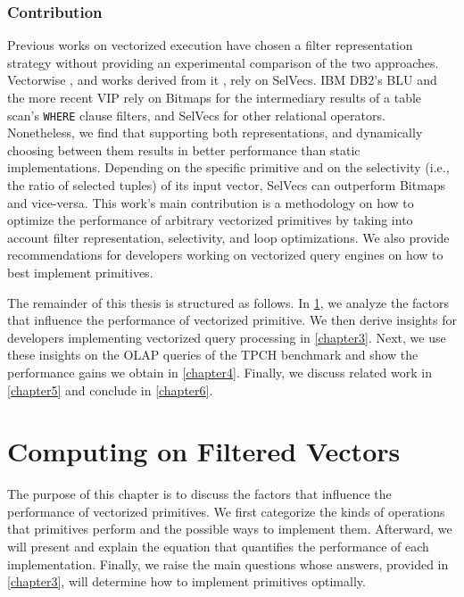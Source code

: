 \documentclass[12pt]{cmuthesis}
\begin{document}
\subsection{Contribution}
Previous works on vectorized execution have chosen a filter representation strategy without providing an experimental comparison of the two approaches. Vectorwise \cite{vectorwise}, and works derived from it \cite{miro_adapt,everything_vectorized,sompolski_vec},  rely on SelVecs. IBM DB2's BLU \cite{ibm_blu} and the more recent VIP \cite{orestis_bitmap} rely on Bitmaps for the intermediary results of a table scan's \texttt{WHERE} clause filters, and SelVecs for other relational operators. Nonetheless, we find that supporting both representations, and dynamically choosing between them results in better performance than static implementations. Depending on the specific primitive and on the selectivity (i.e., the ratio of selected tuples) of its input vector, SelVecs can outperform Bitmaps and vice-versa. This work's main contribution is a methodology on how to optimize the performance of arbitrary vectorized primitives by taking into account filter representation, selectivity, and loop optimizations. We also provide recommendations for developers working on vectorized query engines on how to best implement primitives.

The remainder of this thesis is structured as follows. In \cref{chapter2}, we analyze the factors that influence the performance of vectorized primitive. We then derive insights for developers implementing vectorized query processing in \cref{chapter3}. Next, we use these insights on the OLAP queries of the TPCH \cite{tpch} benchmark and show the performance gains we obtain in \cref{chapter4}. Finally, we discuss related work in \cref{chapter5} and conclude in \cref{chapter6}.



\chapter{Computing on Filtered Vectors}
\label{chapter2}
The purpose of this chapter is to discuss the factors that influence the performance of vectorized primitives. We first categorize the kinds of operations that primitives perform and the possible ways to implement them. Afterward, we will present and explain the equation that quantifies the performance of each implementation. Finally, we raise the main questions whose answers, provided in \cref{chapter3}, will determine how to implement primitives optimally.
\end{document}
